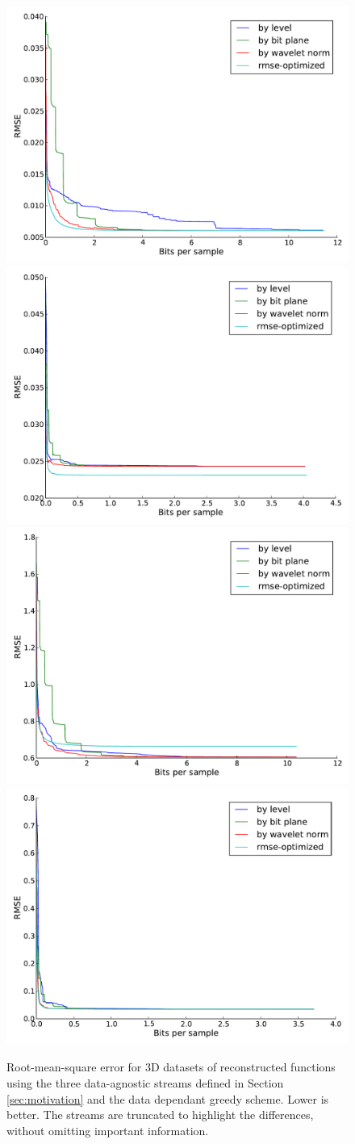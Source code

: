 \begin{figure}
  \centering
        {\includegraphics[width=0.48\linewidth]{img/motivation-3d/rmse-boiler.pdf}}
 	{\includegraphics[width=0.48\linewidth]{img/motivation-3d/rmse-diffusivity.pdf}}
 	{\includegraphics[width=0.48\linewidth]{img/motivation-3d/rmse-turbulence.pdf}}
 	{\includegraphics[width=0.48\linewidth]{img/motivation-3d/rmse-velocityz.pdf}}
 	\caption{Root-mean-square error for 3D datasets of reconstructed functions using the three data-agnostic streams
 	defined in Section \ref{sec:motivation} and the data dependant greedy scheme. Lower is better.
        The streams are truncated to highlight
 	the differences, without omitting important information. }
 	\label{fig:motivation-3d-rmse}
\end{figure}


